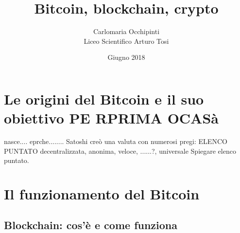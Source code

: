 \documentclass {article}
\title {{\Huge Bitcoin, blockchain, crypto}}
\author {Carlomaria Occhipinti\\Liceo Scientifico Arturo Tosi}
\date {Giugno 2018}
\begin{document}
\maketitle
\newpage
\tableofcontents
{}
\newpage
{}

\section {Le origini del Bitcoin e il suo obiettivo PE RPRIMA OCASà}

nasce.... eprche........
Satoshi creò una valuta con numerosi pregi: ELENCO PUNTATO decentralizzata, anonima, veloce, ......?, universale
Spiegare elenco puntato.

\section {Il funzionamento del Bitcoin}

\subsection {Blockchain: cos'è e come funziona}
\end{document}
